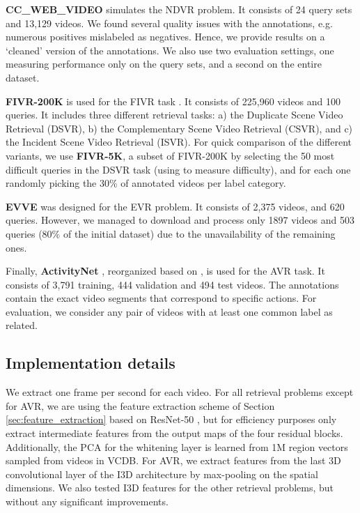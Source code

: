\documentclass[10pt,twocolumn,letterpaper]{article}
\begin{document}
\textbf{CC\_WEB\_VIDEO} \cite{wu2007} simulates the NDVR problem. It consists of 24 query sets and 13,129 videos. We found several quality issues with the annotations, e.g. numerous positives mislabeled as negatives. Hence, we provide results on a `cleaned' version of the annotations. We also use two evaluation settings, one measuring performance only on the query sets, and a second  on the entire dataset. 

\textbf{FIVR-200K} is used for the FIVR task \cite{kordopatis2018}. It consists of 225,960 videos and 100 queries. It includes three different retrieval tasks: a) the Duplicate Scene Video Retrieval (DSVR), b) the Complementary Scene Video Retrieval (CSVR), and c) the Incident Scene Video Retrieval (ISVR).
For quick comparison of the different variants, we use \textbf{FIVR-5K}, a subset of FIVR-200K by selecting the 50 most difficult queries in the DSVR task (using \cite{kordopatis2017a} to measure difficulty), and for each one  randomly picking the 30\% of annotated videos per label category. 





\textbf{EVVE} \cite{revaud2013} was designed for the EVR problem. It consists of 2,375 videos, and 620 queries. However, we managed to download and process only 1897 videos and 503 queries (80\% of the initial dataset) due to the unavailability of the remaining ones. 

Finally, \textbf{ActivityNet} \cite{caba2015}, reorganized based on \cite{feng2018}, is used for the AVR task. It consists of 3,791 training, 444 validation and 494 test videos. The annotations contain the exact video segments that correspond to specific actions. For evaluation, we consider any pair of videos with at least one common label as related. 





\subsection{Implementation details}
\label{sec:experiments}

We extract one frame per second for each video. For all retrieval problems except for AVR, we are using the feature extraction scheme of Section \ref{sec:feature_extraction} based on ResNet-50 \cite{he2016},
but for efficiency purposes only extract intermediate features from the output maps of the four residual blocks. Additionally, the PCA for the whitening layer is learned from 1M region vectors sampled from videos in VCDB. For AVR, we extract features from the last 3D convolutional layer of the I3D architecture \cite{carreira2017} by max-pooling on the spatial dimensions. We also tested I3D features for the other retrieval problems, but without any significant improvements.
\end{document}
